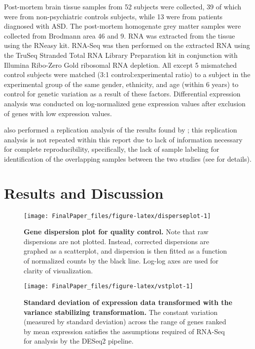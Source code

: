 Post-mortem brain tissue samples from 52 subjects were collected, 39 of
which were from non-psychiatric controls subjects, while 13 were from
patients diagnosed with ASD. The post-mortem homogenate grey matter
samples were collected from Brodmann area 46 and 9. RNA was extracted
from the tissue using the RNeasy kit. RNA-Seq was then performed on the
extracted RNA using the TruSeq Stranded Total RNA Library Preparation
kit in conjunction with Illumina Ribo-Zero Gold ribosomal RNA depletion.
All except 5 mismatched control subjects were matched (3:1
control:experimental ratio) to a subject in the experimental group of
the same gender, ethnicity, and age (within 6 years) to control for
genetic variation as a result of these factors. Differential expression
analysis was conducted on log-normalized gene expression values after
exclusion of genes with low expression values.

\citet{orig-paper} also performed a replication analysis of the results
found by \citet{replicate-paper}; this replication analysis is not
repeated within this report due to lack of information necessary for
complete reproducibility, specifically, the lack of sample labeling for
identification of the overlapping samples between the two studies (see
\citet{orig-paper} for details).

\section{Results and Discussion}\label{results-and-discussion}

\begin{Schunk}
\begin{figure}
\texttt{[image: FinalPaper\_files/figure-latex/disperseplot-1]} \caption{\label{fig:displot}\textbf{Gene dispersion plot for quality control.} Note that raw dispersions are not plotted. Instead, corrected dispersions are graphed as a scatterplot, and dispersion is then fitted as a function of normalized counts by the black line. Log-log axes are used for clarity of visualization.}\label{fig:disperseplot}
\end{figure}
\end{Schunk}

\begin{Schunk}
\begin{figure}
\texttt{[image: FinalPaper\_files/figure-latex/vstplot-1]} \caption{\label{fig:vst}\textbf{Standard deviation of expression data transformed with the variance stabilizing transformation.} The constant variation (measured by standard deviation) across the range of genes ranked by mean expression satisfies the assumptions required of RNA-Seq for analysis by the DESeq2 pipeline.}\label{fig:vstplot}
\end{figure}
\end{Schunk}


